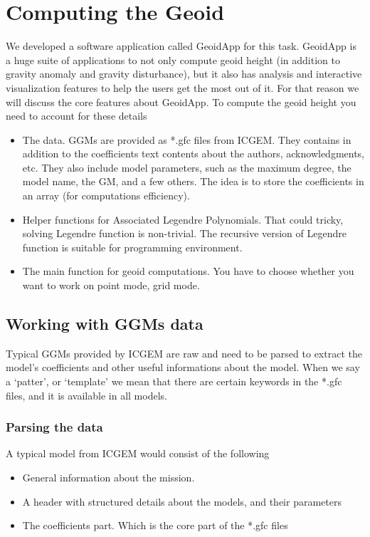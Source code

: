 \section{Computing the Geoid}

We developed a software application called GeoidApp for this task. GeoidApp is a huge suite of applications to not only compute geoid height (in addition to gravity anomaly and gravity disturbance), but it also has analysis and interactive visualization features to help the users get the most out of it. For that reason we will discuss the core features about GeoidApp. To compute the geoid height you need to account for these details

\begin{itemize}
	\item The data. GGMs are provided as *.gfc files from ICGEM. They contains in addition to the coefficients text contents about the authors, acknowledgments, etc. They also include model parameters, such as the maximum degree, the model name, the GM, and a few others. The idea is to store the coefficients in an array (for computations efficiency). 
	\item Helper functions for Associated Legendre Polynomials. That could tricky, solving Legendre function is non-trivial. The recursive version of Legendre function is suitable for programming environment.
	\item The main function for geoid computations. You have to choose whether you want to work on point mode, grid mode.
\end{itemize}

\subsection{Working with GGMs data}

Typical GGMs provided by ICGEM are raw and need to be parsed to extract the model's coefficients and other useful informations about the model. When we say a `patter', or `template' we mean that there are certain keywords in the *.gfc files, and it is available in all models.

\subsubsection{Parsing the data}
A typical model from ICGEM would consist of the following

\begin{itemize}
	\item {General information about the mission}. 
	\item {A header with structured details about the models, and their parameters}
	\item {The coefficients part. Which is the core part of the *.gfc files}
\end{itemize}


